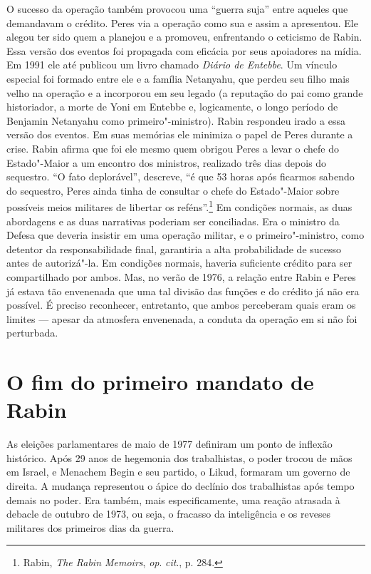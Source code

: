 O sucesso da operação também provocou uma ``guerra suja'' entre aqueles
que demandavam o crédito. Peres via a operação como sua e assim a
apresentou. Ele alegou ter sido quem a planejou e a promoveu,
enfrentando o ceticismo de Rabin. Essa versão dos eventos foi propagada
com eficácia por seus apoiadores na mídia. Em 1991 ele até publicou um
livro chamado \textit{Diário de Entebbe}. Um vínculo especial foi formado
entre ele e a família Netanyahu, que perdeu seu filho mais velho na
operação e a incorporou em seu legado (a reputação do pai como grande
historiador, a morte de Yoni em Entebbe e, logicamente, o longo período
de Benjamin Netanyahu como primeiro"-ministro). Rabin respondeu irado a
essa versão dos eventos. Em suas memórias ele minimiza o papel de Peres
durante a crise. Rabin afirma que foi ele mesmo quem obrigou Peres a levar o
chefe do Estado"-Maior a um encontro dos ministros, realizado três dias
depois do sequestro. ``O fato deplorável'', descreve, ``é que 53
horas após ficarmos sabendo do sequestro, Peres ainda tinha de
consultar o chefe do Estado"-Maior sobre possíveis meios militares de
libertar os reféns''.\footnote{Rabin, \textit{The Rabin Memoirs},
\textit{op}. \textit{cit}., p. 284.} Em condições normais, as duas
abordagens e as duas narrativas poderiam ser conciliadas. Era o ministro
da Defesa que deveria insistir em uma operação militar, e o primeiro"-ministro,
como detentor da responsabilidade final, garantiria a alta
probabilidade de sucesso antes de autorizá"-la. Em condições normais,
haveria suficiente crédito para ser compartilhado por ambos. Mas, no
verão de 1976, a relação entre Rabin e Peres já estava tão envenenada que
uma tal divisão das funções e do crédito já não era possível. É preciso
reconhecer, entretanto, que ambos perceberam quais eram os limites ---
apesar da atmosfera envenenada, a conduta da operação em si não foi
perturbada.

\section{O fim do primeiro mandato de Rabin}

As eleições parlamentares de maio de 1977 definiram um ponto de inflexão
histórico. Após 29 anos de hegemonia dos trabalhistas, o poder
trocou de mãos em Israel, e Menachem Begin e seu partido, o Likud,
formaram um governo de direita. A mudança representou o ápice do
declínio dos trabalhistas após tempo demais no poder. Era também, mais
especificamente, uma reação atrasada à debacle de outubro de 1973, ou
seja, o fracasso da inteligência e os reveses militares dos primeiros
dias da guerra.

